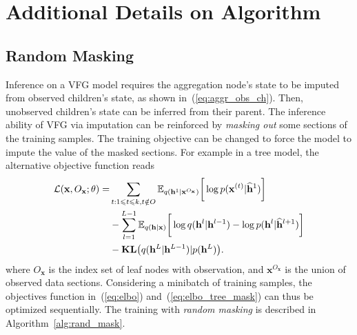 \documentclass[twoside]{article}
\begin{document}
\section{Additional Details on Algorithm}%
\subsection{Random Masking}

Inference on a VFG model requires the aggregation node's state to be imputed from observed children's state, as shown in~(\ref{eq:aggr_obs_ch}).
Then, unobserved children's state can be inferred from their parent.  
The inference ability of VFG via imputation can be reinforced by \emph{masking out} some sections of the training samples. 
The training objective can be changed to force the model to impute the value of the masked sections. 
For example in a tree model, the alternative objective function reads
\begin{align}  \label{eq:elbo_tree_mask}
\mathcal{L}(\mathbf{x}, O_{\mathbf{x}}; \theta)
= & \sum_{t: 1\leqslant t \leqslant k, t\notin O}
 \mathbb{E}_{q(\mathbf{h}^{1}|\mathbf{x}^{O_{\mathbf{x}}} )} \bigg[ \log p( \mathbf{x}^{(t)}|  \widehat{\mathbf{h}}^{1})   \bigg] \\ \notag
 &- \sum_{l=1}^{L-1}  \mathbb{E}_{q(\mathbf{h}|\mathbf{x})} \bigg[ \log q(\mathbf{h}^{l}|\mathbf{h}^{l-1}) - \log p( \mathbf{h}^{l}|  \widehat{\mathbf{h}}^{l+1})   \bigg]    
\\ \notag
& -  \textbf{\text{KL}}\big(q(\mathbf{h}^L | \mathbf{h}^{L-1} )   | p(\mathbf{h}^L)  \big).
\end{align} %
where $O_{\mathbf{x}}$ is the index set of leaf nodes  with observation, and $\mathbf{x}^{O_{\mathbf{x}}}$ is the union of observed data sections. 
Considering a minibatch of training samples, the objectives function in~(\ref{eq:elbo})
and~(\ref{eq:elbo_tree_mask}) can thus be optimized sequentially. 
The training with \emph{random masking} is described in Algorithm~\ref{alg:rand_mask}. 
\end{document}
